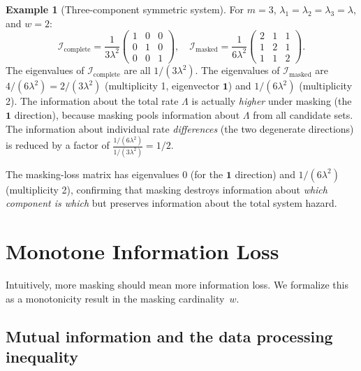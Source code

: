\documentclass[11pt]{article}
\theoremstyle{definition}
\newtheorem{example}{Example}
\theoremstyle{plain}
\renewcommand{\v}[1]{\boldsymbol{#1}}
\newcommand{\FI}{\mathcal{I}}       %
\begin{document}
\begin{example}[Three-component symmetric system]
\label{ex:three-component}
For $m = 3$, $\lambda_1 = \lambda_2 = \lambda_3 = \lambda$,
and $w = 2$:
\begin{equation}
    \FI_{\mathrm{complete}}
    = \frac{1}{3\lambda^2}
    \begin{pmatrix} 1 & 0 & 0 \\ 0 & 1 & 0 \\ 0 & 0 & 1 \end{pmatrix},
    \quad
    \FI_{\mathrm{masked}}
    = \frac{1}{6\lambda^2}
    \begin{pmatrix} 2 & 1 & 1 \\ 1 & 2 & 1 \\ 1 & 1 & 2 \end{pmatrix}.
\end{equation}
The eigenvalues of $\FI_{\mathrm{complete}}$ are all $1/(3\lambda^2)$.
The eigenvalues of $\FI_{\mathrm{masked}}$ are
$4/(6\lambda^2) = 2/(3\lambda^2)$ (multiplicity 1, eigenvector
$\v{1}$) and
$1/(6\lambda^2)$ (multiplicity 2).
The information about the total rate $\Lambda$ is actually
\emph{higher} under masking (the $\v{1}$ direction), because masking
pools information about $\Lambda$ from all candidate sets.
The information about individual rate \emph{differences} (the two
degenerate directions) is reduced by a factor of
$\frac{1/(6\lambda^2)}{1/(3\lambda^2)} = 1/2$.

The masking-loss matrix has eigenvalues 0 (for the $\v{1}$ direction)
and $1/(6\lambda^2)$ (multiplicity 2), confirming that masking
destroys information about \emph{which component is which} but
preserves information about the total system hazard.
\end{example}


\section{Monotone Information Loss}
\label{sec:monotone}

Intuitively, more masking should mean more information loss.
We formalize this as a monotonicity result in the masking
cardinality~$w$.

\subsection{Mutual information and the data processing inequality}
\end{document}

